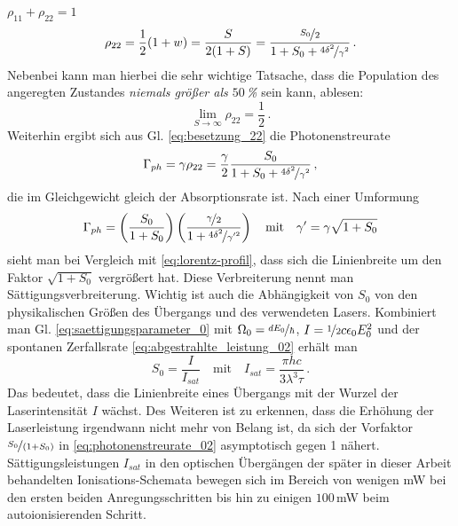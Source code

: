 $\rho_{11}+\rho_{22}=1$
\begin{equation}\label{eq:besetzung_22}
	\rho_{22}=\frac{1}{2}(1+w)=\frac{S}{2(1+S)}=\frac{\nicefrac{S_0}{2}}{1+S_0+\nicefrac{4\delta^2}{\gamma^2}}\,.
\end{equation}
Nebenbei kann man hierbei die sehr wichtige Tatsache, dass die Population des
angeregten Zustandes \textit{niemals größer als $50\,$\%} sein kann, ablesen:
\begin{equation}\label{eq:besetzung_22_kleiner-gleich_50}
	\lim_{S\to\infty}\rho_{22}=\frac{1}{2}\,.
\end{equation}
Weiterhin ergibt sich aus Gl. \eqref{eq:besetzung_22} die Photonenstreurate
\begin{equation}\label{eq:photonenstreurate_01}
	\Gamma_{ph}=\gamma\rho_{22}=\frac{\gamma}{2}\frac{S_0}{1+S_0+\nicefrac{4\delta^2}{\gamma^2}}\,,
\end{equation}
die im Gleichgewicht gleich der Absorptionsrate ist.
Nach einer Umformung
\begin{equation}\label{eq:photonenstreurate_02}
	\Gamma_{ph}=\left(\frac{S_0}{1+S_0}\right)\left(\frac{\nicefrac{\gamma}{2}}{1+\nicefrac{4\delta^2}{\gamma'^2}}\right)
	\quad\text{mit}\quad
	\gamma'=\gamma\sqrt{1+S_0}
\end{equation}
sieht man bei Vergleich mit \eqref{eq:lorentz-profil}, dass sich die
Linienbreite um den Faktor $\sqrt{1+S_0}$ vergrößert hat. Diese Verbreiterung
nennt man Sättigungsverbreiterung. Wichtig ist auch die Abhängigkeit von $S_0$
von den physikalischen Größen des Übergangs und des verwendeten Lasers.
Kombiniert man Gl. \eqref{eq:saettigungsparameter_0} mit
$\Omega_0=\nicefrac{dE_0}{\hbar}$, $I=\nicefrac{1}{2}c\epsilon_0E_0^2$ und der
spontanen Zerfallsrate \eqref{eq:abgestrahlte_leistung_02} erhält man
\begin{equation}\label{eq:saettigungsparameter_physikalische_groessen}
		S_0=\frac{I}{I_{sat}}
		\quad\text{mit}\quad
		I_{sat}=\frac{\pi hc}{3\lambda^3\tau}\,.
\end{equation}
Das bedeutet, dass die Linienbreite eines Übergangs mit der Wurzel der
Laserintensität $I$ wächst. Des Weiteren
ist zu erkennen, dass die Erhöhung der Laserleistung irgendwann nicht mehr
von Belang ist, da sich der Vorfaktor $\nicefrac{S_0}{\left(1+S_0\right)}$ in
\eqref{eq:photonenstreurate_02} asymptotisch gegen 1 nähert.
Sättigungsleistungen $I_{sat}$ in den optischen Übergängen der später in dieser
Arbeit behandelten Ionisations-Schemata bewegen sich im Bereich von wenigen
mW bei den ersten beiden Anregungsschritten bis hin zu einigen
$100\,$mW beim autoionisierenden Schritt.

